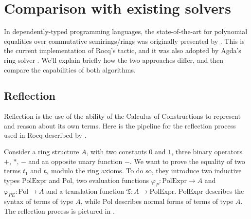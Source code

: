 \section{Comparison with existing solvers}
\label{sec:comparison_main}

In dependently-typed programming languages, the state-of-the-art for polynomial equalities over commutative semirings/rings was originally presented by \textcite{coq_ring}. This is the current implementation of Rocq's \ring tactic, and it was also adopted by Agda's ring solver \parencite{agda_solver}. We'll explain briefly how the two approaches differ, and then compare the capabilities of both algorithms.

\subsection{Reflection}
\label{sec:reflection}

\newcommand{\Pol}{\mathrm{Pol}}
\newcommand{\PolExpr}{\mathrm{PolExpr}}

Reflection is the use of the ability of the Calculus of Constructions to represent and reason about its own terms. Here is the pipeline for the reflection process used in Rocq described by \citeauthor{coq_ring}.

Consider a ring structure $A$, with two constants $0$ and $1$, three binary operators $+$, $*$, $-$ and an opposite unary function $-$. We want to prove the equality of two terms $t_1$ and $t_2$ modulo the ring axioms. To do so, they introduce two inductive types $\PolExpr$ and $\Pol$, two evaluation functions $\varphi_P : \PolExpr \to A$ and $\varphi_{PE} : \Pol \to A$ and a translation function $\mathfrak T : A \to \PolExpr$. $\PolExpr$ describes the syntax of terms of type $A$, while $\Pol$ describes normal forms of terms of type $A$. 
The reflection process is pictured in .

